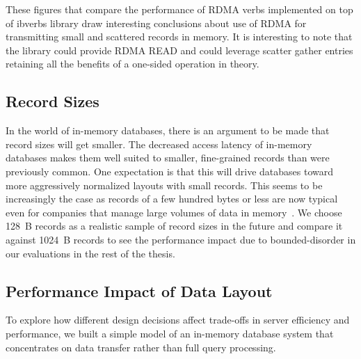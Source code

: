 These figures that compare the performance of RDMA verbs implemented 
on top of ibverbs library draw interesting conclusions about use of RDMA for transmitting small and scattered records in memory. 
It is interesting to note that the library could provide RDMA READ and could leverage scatter gather entries retaining all the benefits 
of a one-sided operation in theory.


\subsection{Record Sizes}
In the world of in-memory databases, there is an argument to be made that record sizes will get smaller.
The decreased access latency of in-memory databases makes them well suited to smaller, fine-grained records
than were previously common. One expectation is that this will drive databases
toward more aggressively normalized layouts with small records. This
seems to be increasingly the case as records of a few hundred bytes or less
are now typical even for companies that manage large volumes of data in memory~\cite{fb-memcache,fb-workload}. 
We choose 128~B records as a realistic sample of record sizes in the future and compare it against 
1024~B records to see the performance impact due to bounded-disorder in our evaluations in the rest of the thesis.



\subsection{Performance Impact of Data Layout}
\label{sec:zero-copy-tput}

%
To explore how different design decisions affect trade-offs in server efficiency and
performance, we built a simple model of an in-memory database system that
concentrates on data transfer rather than full query processing.

